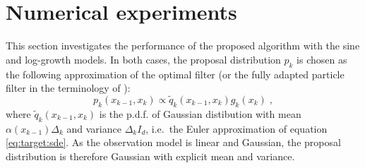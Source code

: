 \documentclass[12pt]{article}
\newcommand{\eqsp}{\;}
\newcommand{\1}{\mathrm{1}}
\begin{document}
\section{Numerical experiments}
\label{sec:exp}
This section investigates the performance of the proposed algorithm with the sine and log-growth models. In both cases, the proposal distribution $p_k$ is chosen as the following approximation of the optimal filter (or the fully adapted particle filter in the terminology of \cite{pitt:shephard:1999}): 
$$p_k(x_{k-1},x_k)\propto \tilde{q}_k(x_{k-1}, x_k)g_k(x_{k})\eqsp,$$
where $\tilde{q}_k(x_{k-1},x_k)$ is the p.d.f. of Gaussian distibution with mean $\alpha(x_{k-1})\Delta_k$ and variance $\Delta_kI_d$, i.e.\ the Euler approximation of equation \eqref{eq:target:sde}. As the observation model is linear and Gaussian, the proposal distribution is therefore Gaussian with explicit mean and variance.
\end{document}
